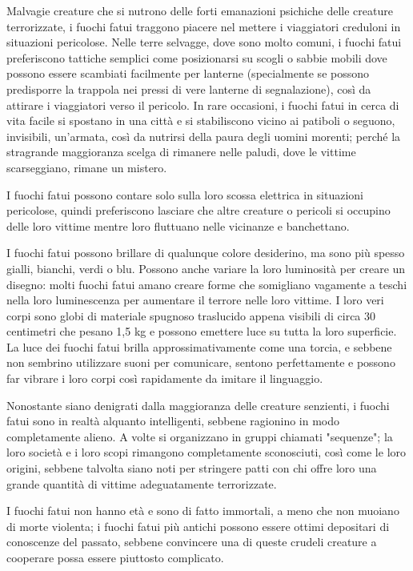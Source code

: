 \begin{multicols}{2}
	Malvagie creature che si nutrono delle forti emanazioni psichiche delle creature terrorizzate, i fuochi fatui traggono piacere nel mettere i viaggiatori creduloni in situazioni pericolose. Nelle terre selvagge, dove sono molto comuni, i fuochi fatui preferiscono tattiche semplici come posizionarsi su scogli o sabbie mobili dove possono essere scambiati facilmente per lanterne (specialmente se possono predisporre la trappola nei pressi di vere lanterne di segnalazione), così da attirare i viaggiatori verso il pericolo. In rare occasioni, i fuochi fatui in cerca di vita facile si spostano in una città e si stabiliscono vicino ai patiboli o seguono, invisibili, un'armata, così da nutrirsi della paura degli uomini morenti; perché la stragrande maggioranza scelga di rimanere nelle paludi, dove le vittime scarseggiano, rimane un mistero.

	I fuochi fatui possono contare solo sulla loro scossa elettrica in situazioni pericolose, quindi preferiscono lasciare che altre creature o pericoli si occupino delle loro vittime mentre loro fluttuano nelle vicinanze e banchettano.

	I fuochi fatui possono brillare di qualunque colore desiderino, ma sono più spesso gialli, bianchi, verdi o blu. Possono anche variare la loro luminosità per creare un disegno: molti fuochi fatui amano creare forme che somigliano vagamente a teschi nella loro luminescenza per aumentare il terrore nelle loro vittime. I loro veri corpi sono globi di materiale spugnoso traslucido appena visibili di circa 30 centimetri che pesano 1,5 kg e possono emettere luce su tutta la loro superficie. La luce dei fuochi fatui brilla approssimativamente come una torcia, e sebbene non sembrino utilizzare suoni per comunicare, sentono perfettamente e possono far vibrare i loro corpi così rapidamente da imitare il linguaggio.

	Nonostante siano denigrati dalla maggioranza delle creature senzienti, i fuochi fatui sono in realtà alquanto intelligenti, sebbene ragionino in modo completamente alieno. A volte si organizzano in gruppi chiamati "sequenze"; la loro società e i loro scopi rimangono completamente sconosciuti, così come le loro origini, sebbene talvolta siano noti per stringere patti con chi offre loro una grande quantità di vittime adeguatamente terrorizzate.

	I fuochi fatui non hanno età e sono di fatto immortali, a meno che non muoiano di morte violenta; i fuochi fatui più antichi possono essere ottimi depositari di conoscenze del passato, sebbene convincere una di queste crudeli creature a cooperare possa essere piuttosto complicato.



\end{multicols}
